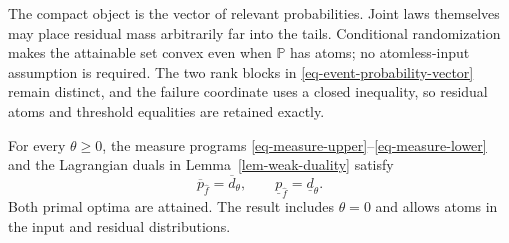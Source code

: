 The compact object is the vector of relevant probabilities. Joint laws themselves may place residual mass arbitrarily far into the tails. Conditional randomization makes the attainable set convex even when $\mathbb P$ has atoms; no atomless-input assumption is required. The two rank blocks in \eqref{eq-event-probability-vector} remain distinct, and the failure coordinate uses a closed inequality, so residual atoms and threshold equalities are retained exactly.

\begin{theorem}
  \label{thm-finite-dual-reformulations}
  For every $\theta\ge0$, the measure programs \eqref{eq-measure-upper}--\eqref{eq-measure-lower} and the Lagrangian duals in Lemma~\ref{lem-weak-duality} satisfy
  \begin{equation}
    \overline p_{\hat f}=\overline d_\theta,
    \qquad
    \underline p_{\hat f}=\underline d_\theta.
    \label{eq-strong-duality}
  \end{equation}
  Both primal optima are attained. The result includes $\theta=0$ and allows atoms in the input and residual distributions.
\end{theorem}
